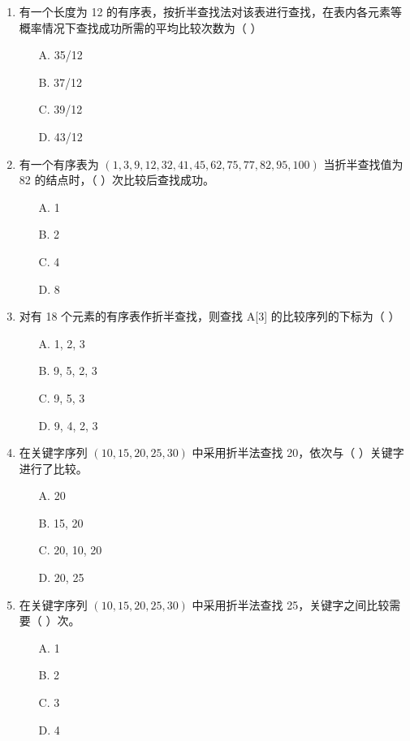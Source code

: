 \documentclass[12pt, a4paper]{article}
\begin{document}
\begin{enumerate}[label=\arabic*.]
	\item 有一个长度为 12 的有序表，按折半查找法对该表进行查找，在表内各元素等概率情况下查找成功所需的平均比较次数为（ ）
	      \begin{enumerate}
		      \item[A.] 35/12
		      \item[B.] 37/12
		      \item[C.] 39/12
		      \item[D.] 43/12
	      \end{enumerate}

	\item 有一个有序表为 $(1, 3, 9, 12, 32, 41, 45, 62, 75, 77, 82, 95, 100)$ 当折半查找值为 82 的结点时，（ ）次比较后查找成功。
	      \begin{enumerate}
		      \item[A.] 1
		      \item[B.] 2
		      \item[C.] 4
		      \item[D.] 8
	      \end{enumerate}

	\item 对有 18 个元素的有序表作折半查找，则查找 A[3] 的比较序列的下标为（ ）
	      \begin{enumerate}
		      \item[A.] 1, 2, 3
		      \item[B.] 9, 5, 2, 3
		      \item[C.] 9, 5, 3
		      \item[D.] 9, 4, 2, 3
	      \end{enumerate}

	\item 在关键字序列 $(10, 15, 20, 25, 30)$ 中采用折半法查找 20，依次与（ ）关键字进行了比较。
	      \begin{enumerate}
		      \item[A.] 20
		      \item[B.] 15, 20
		      \item[C.] 20, 10, 20
		      \item[D.] 20, 25
	      \end{enumerate}

	\item 在关键字序列 $(10, 15, 20, 25, 30)$ 中采用折半法查找 25，关键字之间比较需要（ ）次。
	      \begin{enumerate}
		      \item[A.] 1
		      \item[B.] 2
		      \item[C.] 3
		      \item[D.] 4
	      \end{enumerate}


\end{enumerate}
\end{document}
